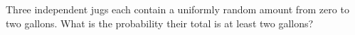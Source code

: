 Three independent jugs each contain a uniformly random amount from zero to two gallons. What is the probability their total is at least two gallons?
